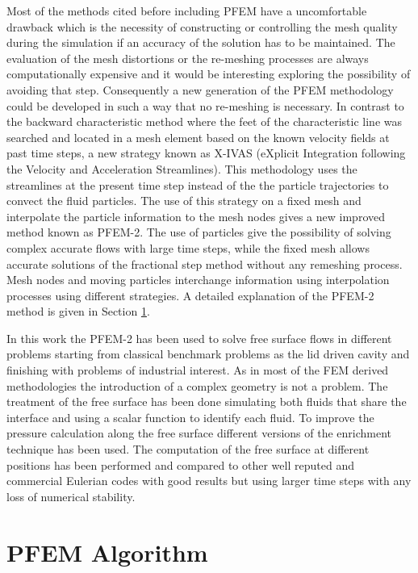 \documentclass[a4paper,conference]{IEEEtran}
\begin{document}
Most of the methods cited before including PFEM have a uncomfortable drawback which is the necessity of constructing or controlling the mesh quality during the simulation if an accuracy of the solution has to be maintained. The evaluation of the mesh distortions or the re-meshing processes are always computationally expensive and it would be interesting exploring the possibility of avoiding that step. Consequently a new generation of the PFEM methodology could be developed in such a way that no re-meshing is necessary.
In contrast to the backward characteristic method where the feet of the characteristic line was searched and located in a mesh element based on the known velocity fields at past time steps, a new strategy known as X-IVAS (eXplicit Integration following the Velocity and Acceleration Streamlines)\cite{Idelsohn12}. This methodology uses the streamlines at the present time step instead of the the particle trajectories to convect the fluid particles. The use of this strategy on a fixed mesh and interpolate the particle information to the mesh nodes gives a new improved method known as PFEM-2\cite{Idelsohn12b}. The use of particles give the possibility of solving complex accurate flows with large time steps, while the fixed mesh allows accurate solutions of the fractional step method without any remeshing process. Mesh nodes and moving particles interchange information using interpolation processes using different strategies. A detailed explanation of the PFEM-2 method is given in Section \ref{PFEM_Algorithm}.

In this work the PFEM-2 has been used to solve free surface flows in different problems starting from classical benchmark problems as the lid driven cavity and finishing with problems of industrial interest. As in most of the FEM derived methodologies the introduction of a complex geometry is not a problem. The treatment of the free surface has been done simulating both fluids that share the interface and using a scalar function to identify each fluid. To improve the pressure calculation along the free surface different versions of the enrichment technique \cite{Coppola} has been used. The computation of the free surface at different positions has been performed and compared to other well reputed and commercial Eulerian codes with good results but using larger time steps with any loss of numerical stability. 

  
\section{PFEM Algorithm}\label{PFEM_Algorithm}
\end{document}
